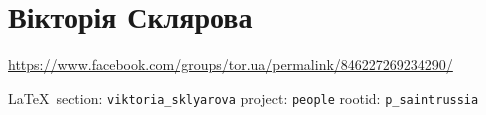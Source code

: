 
 
\section{Вікторія Склярова}

\url{https://www.facebook.com/groups/tor.ua/permalink/846227269234290/}
  
\vspace{0.5cm}
{\small\LaTeX~section: \verb|viktoria_sklyarova| project: \verb|people| rootid: \verb|p_saintrussia|}
\vspace{0.5cm}




